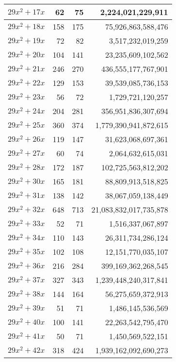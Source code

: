 \documentclass[a4paper]{amsproc}
\theoremstyle{plain}
\theoremstyle{named}
\begin{document}
\begin{longtable}{ | l | r | r | r | }
$29x^2 + 17x$ & 62 & 75 & 2{,}224{,}021{,}229{,}911 \\ \hline
$29x^2 + 18x$ & 158 & 175 & 75{,}926{,}863{,}588{,}476 \\ \hline
$29x^2 + 19x$ & 72 & 82 & 3{,}517{,}232{,}019{,}259 \\ \hline
$29x^2 + 20x$ & 104 & 141 & 23{,}235{,}609{,}102{,}562 \\ \hline
$29x^2 + 21x$ & 246 & 270 & 436{,}555{,}177{,}767{,}901 \\ \hline
$29x^2 + 22x$ & 129 & 153 & 39{,}539{,}085{,}736{,}153 \\ \hline
$29x^2 + 23x$ & 56 & 72 & 1{,}729{,}721{,}120{,}257 \\ \hline
$29x^2 + 24x$ & 204 & 281 & 356{,}951{,}836{,}307{,}694 \\ \hline
$29x^2 + 25x$ & 360 & 374 & 1{,}779{,}390{,}941{,}872{,}615 \\ \hline
$29x^2 + 26x$ & 119 & 147 & 31{,}623{,}068{,}697{,}361 \\ \hline
$29x^2 + 27x$ & 60 & 74 & 2{,}064{,}632{,}615{,}031 \\ \hline
$29x^2 + 28x$ & 172 & 187 & 102{,}725{,}563{,}812{,}202 \\ \hline
$29x^2 + 30x$ & 165 & 181 & 88{,}809{,}913{,}518{,}825 \\ \hline
$29x^2 + 31x$ & 138 & 142 & 38{,}067{,}059{,}138{,}449 \\ \hline
$29x^2 + 32x$ & 648 & 713 & 21{,}083{,}832{,}017{,}735{,}878 \\ \hline
$29x^2 + 33x$ & 52 & 71 & 1{,}516{,}337{,}067{,}897 \\ \hline
$29x^2 + 34x$ & 110 & 143 & 26{,}311{,}734{,}286{,}124 \\ \hline
$29x^2 + 35x$ & 102 & 108 & 12{,}151{,}770{,}035{,}107 \\ \hline
$29x^2 + 36x$ & 216 & 284 & 399{,}169{,}362{,}268{,}545 \\ \hline
$29x^2 + 37x$ & 327 & 343 & 1{,}239{,}448{,}240{,}317{,}841 \\ \hline
$29x^2 + 38x$ & 144 & 164 & 56{,}275{,}659{,}372{,}913 \\ \hline
$29x^2 + 39x$ & 51 & 71 & 1{,}486{,}145{,}536{,}569 \\ \hline
$29x^2 + 40x$ & 100 & 141 & 22{,}263{,}542{,}795{,}470 \\ \hline
$29x^2 + 41x$ & 50 & 71 & 1{,}450{,}569{,}522{,}151 \\ \hline
$29x^2 + 42x$ & 318 & 424 & 1{,}939{,}162{,}092{,}690{,}273 \\ \hline

\end{longtable}
\end{document}
